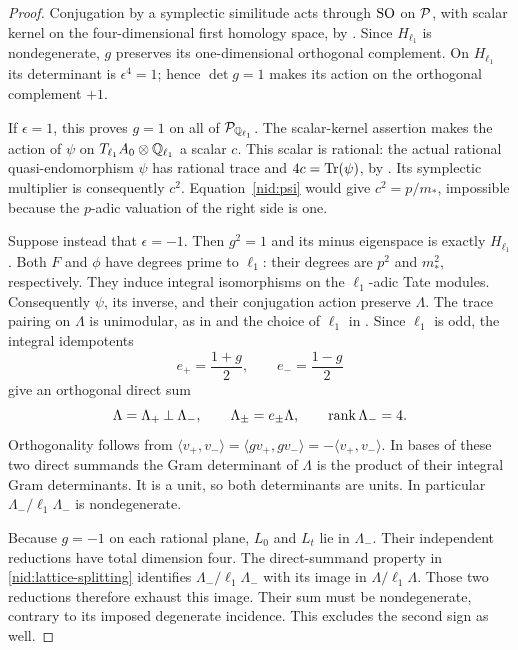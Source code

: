 \begin{proof}
Conjugation by a symplectic similitude acts through $\operatorname{SO}$ on $\mathcal P$,
with scalar kernel on the four-dimensional first homology space, by
.  Since $H_{\ell_1}$ is nondegenerate, $g$ preserves
its one-dimensional orthogonal complement.  On $H_{\ell_1}$ its
determinant is $\epsilon^4=1$; hence $\det g=1$ makes its action on the
orthogonal complement $+1$.

If $\epsilon=1$, this proves $g=1$ on all of $\mathcal P_{\mathbb Q_{\ell_1}}$.
The scalar-kernel assertion makes the action of $\psi$ on
$T_{\ell_1}A_0\otimes\mathbb Q_{\ell_1}$ a scalar $c$.  This scalar is rational:
the actual rational quasi-endomorphism $\psi$ has rational trace and
$4c=\operatorname{Tr}(\psi)$, by \cite[Proposition~12.9]{MilneAV}.  Its symplectic
multiplier is consequently $c^2$.  Equation~\eqref{nid:psi} would give
$c^2=p/m_*$, impossible because the $p$-adic valuation of the right
side is one.

Suppose instead that $\epsilon=-1$.  Then $g^2=1$ and its minus
eigenspace is exactly $H_{\ell_1}$.  Both $F$ and $\phi$ have degrees prime
to $\ell_1$: their degrees are $p^2$ and $m_*^2$, respectively.
They induce integral isomorphisms on the $\ell_1$-adic Tate modules.
Consequently $\psi$, its inverse, and their conjugation action preserve
$\Lambda$.  The trace pairing on $\Lambda$ is unimodular, as in
 and the choice of $\ell_1$ in
.  Since $\ell_1$ is odd, the integral idempotents
\[
 e_+=\frac{1+g}{2},\qquad e_-=\frac{1-g}{2}
\]
give an orthogonal direct sum
\begin{equation}
 \label{nid:lattice-splitting}
 \Lambda=\Lambda_+\mathbin{\perp}\Lambda_-,
 \qquad \Lambda_\pm=e_\pm\Lambda,
 \qquad \operatorname{rank}\Lambda_-=4.
\end{equation}
Orthogonality follows from
$\langle v_+,v_-\rangle=\langle gv_+,gv_-\rangle
=-\langle v_+,v_-\rangle$.
In bases of these two direct summands the Gram determinant of $\Lambda$
is the product of their integral Gram determinants.  It is a unit, so
both determinants are units.  In particular
$\Lambda_-/\ell_1\Lambda_-$ is nondegenerate.

Because $g=-1$ on each rational plane, $L_0$ and $L_t$ lie in
$\Lambda_-$.  Their independent reductions have total dimension four.
The direct-summand property in \eqref{nid:lattice-splitting} identifies
$\Lambda_-/\ell_1\Lambda_-$ with its image in $\Lambda/\ell_1\Lambda$.
Those two reductions therefore exhaust this image.  Their sum must be
nondegenerate, contrary to its imposed degenerate incidence.  This
excludes the second sign as well.
\end{proof}


